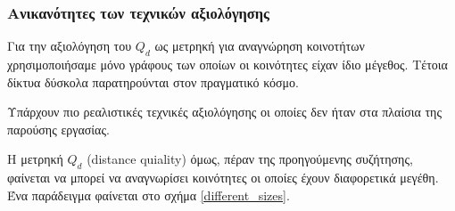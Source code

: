 \documentclass[12pt, letterpaper]{article}
\begin{document}
\subsubsection{Ανικανότητες των τεχνικών αξιολόγησης}

Για την αξιολόγηση του $Q_d$ ως μετρηκή για αναγνώρηση κοινοτήτων χρησιμοποιήσαμε 
μόνο γράφους των οποίων οι κοινότητες είχαν ίδιο μέγεθος. Τέτοια δίκτυα δύσκολα παρατηρούνται στον πραγματικό κόσμο. 

Υπάρχουν πιο ρεαλιστικές τεχνικές αξιολόγησης \cite{benchmark_realistic} οι οποίες δεν 
ήταν στα πλαίσια της παρούσης εργασίας. 

Η μετρηκή $Q_d$ (\textlatin{distance quiality}) όμως, πέραν της προηγούμενης συζήτησης,
φαίνεται να μπορεί να αναγνωρίσει κοινότητες οι οποίες έχουν διαφορετικά μεγέθη. 
Ένα παράδειγμα φαίνεται στο σχήμα \ref{different_sizes}.
\end{document}
